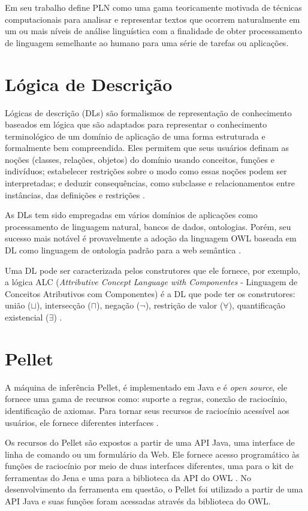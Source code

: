 \documentclass{bcc}
\begin{document}
Em seu trabalho \cite{liddy2001} define PLN como uma gama teoricamente motivada de técnicas computacionais para analisar e representar textos que ocorrem naturalmente em um ou mais níveis de análise linguística com a finalidade de obter processamento de linguagem semelhante ao humano para uma série de tarefas ou aplicações.

\section{Lógica de Descrição}

Lógicas de descrição (DLs) são formalismos de representação de conhecimento baseados em lógica que são adaptados para representar o conhecimento terminológico de um domínio de aplicação de uma forma estruturada e formalmente bem compreendida. Eles permitem que seus usuários definam as noções (classes, relações, objetos) do domínio usando conceitos, funções e indivíduos; estabelecer restrições sobre o modo como essas noções podem ser interpretadas; e deduzir consequências, como subclasse e relacionamentos entre instâncias, das definições e restrições \cite{baader2001}.

As DLs tem sido empregadas em vários domínios de aplicações como processamento de linguagem natural, bancos de dados, ontologias. Porém, seu sucesso mais notável é provavelmente a adoção da linguagem OWL baseada em DL como linguagem de ontologia padrão para a web semântica \cite{baader2002}.

Uma DL pode ser caracterizada pelos construtores que ele fornece, por exemplo, a lógica ALC (\textit{Attributive Concept Language with Componentes} - Linguagem de Conceitos Atributivos com Componentes) é a DL que pode ter os construtores: união ($\sqcup$), intersecção ($\sqcap$), negação ($\neg$), restrição de valor ($\forall$), quantificação existencial ($\exists$) \cite{kepler2006}.

\section{Pellet}

A máquina de inferência Pellet, é implementado em Java e é \textit{open source}, ele fornece uma gama de recursos como: suporte a regras, conexão de raciocínio, identificação de axiomas. Para tornar seus recursos de raciocínio acessível aos usuários, ele fornece diferentes interfaces \cite{sirin2007}. 

Os recursos do Pellet são expostos a partir de uma API Java, uma interface de linha de comando ou um formulário da Web. Ele fornece acesso programático às funções de raciocínio por meio de duas interfaces diferentes, uma para o kit de ferramentas do Jena e uma para a biblioteca da API do OWL \cite{parsia2004}. No desenvolvimento da ferramenta em questão, o Pellet foi utilizado a partir de uma API Java e suas funções foram acessadas através da biblioteca do OWL. 
\end{document}
